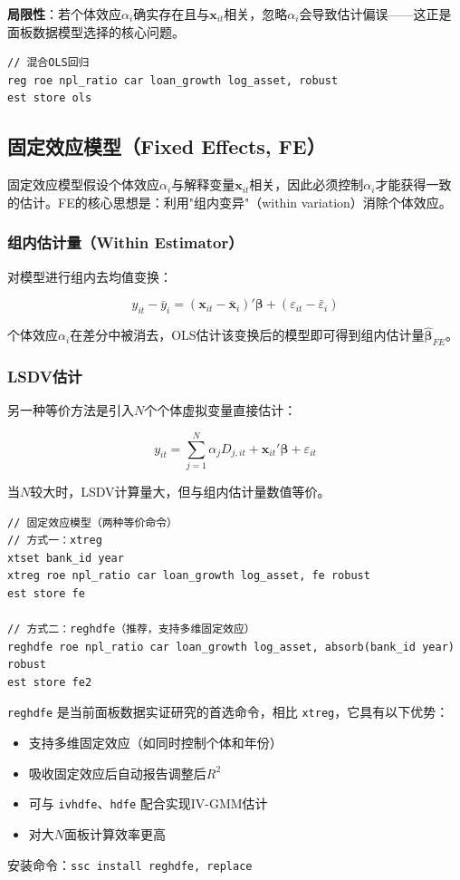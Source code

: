 \textbf{局限性}：若个体效应$\alpha_i$确实存在且与$\mathbf{x}_{it}$相关，忽略$\alpha_i$会导致估计偏误——这正是面板数据模型选择的核心问题。

\begin{lstlisting}[style=stata]
// 混合OLS回归
reg roe npl_ratio car loan_growth log_asset, robust
est store ols
\end{lstlisting}

\subsection{固定效应模型（Fixed Effects, FE）}

固定效应模型假设个体效应$\alpha_i$与解释变量$\mathbf{x}_{it}$相关，因此必须控制$\alpha_i$才能获得一致的估计。FE的核心思想是：利用"组内变异"（within variation）消除个体效应。

\subsubsection{组内估计量（Within Estimator）}

对模型进行组内去均值变换：

\[
y_{it} - \bar{y}_i = (\mathbf{x}_{it} - \bar{\mathbf{x}}_i)'\boldsymbol{\beta} + (\varepsilon_{it} - \bar{\varepsilon}_i)
\]

个体效应$\alpha_i$在差分中被消去，OLS估计该变换后的模型即可得到组内估计量$\hat{\boldsymbol{\beta}}_{FE}$。

\subsubsection{LSDV估计}

另一种等价方法是引入$N$个个体虚拟变量直接估计：

\[
y_{it} = \sum_{j=1}^{N}\alpha_j D_{j,it} + \mathbf{x}_{it}'\boldsymbol{\beta} + \varepsilon_{it}
\]

当$N$较大时，LSDV计算量大，但与组内估计量数值等价。

\begin{lstlisting}[style=stata]
// 固定效应模型（两种等价命令）
// 方式一：xtreg
xtset bank_id year
xtreg roe npl_ratio car loan_growth log_asset, fe robust
est store fe

// 方式二：reghdfe（推荐，支持多维固定效应）
reghdfe roe npl_ratio car loan_growth log_asset, absorb(bank_id year) robust
est store fe2
\end{lstlisting}

\begin{notebox}
\texttt{reghdfe} 是当前面板数据实证研究的首选命令，相比 \texttt{xtreg}，它具有以下优势：
\begin{itemize}
  \item 支持多维固定效应（如同时控制个体和年份）
  \item 吸收固定效应后自动报告调整后$R^2$
  \item 可与 \texttt{ivhdfe}、\texttt{hdfe} 配合实现IV-GMM估计
  \item 对大$N$面板计算效率更高
\end{itemize}
安装命令：\texttt{ssc install reghdfe, replace}
\end{notebox}

